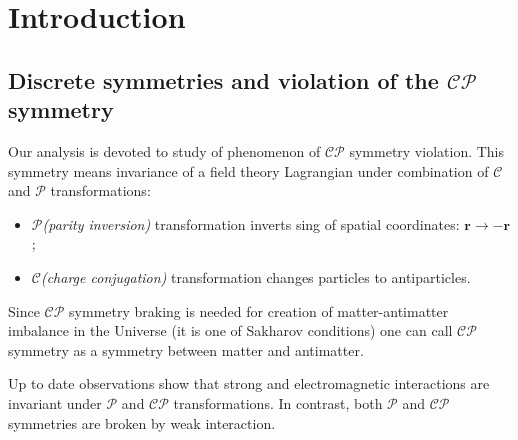 \documentclass[preprint,aps,showpacs]{revtex4}
\newcommand{\cpconj}{\ensuremath{\mathcal{CP}}\xspace}
\newcommand{\pconj}{\ensuremath{\mathcal{P}}\xspace}
\newcommand{\cconj}{\ensuremath{\mathcal{C}}\xspace}
\begin{document}

\maketitle

\tableofcontents

{\renewcommand{\thefootnote}{\fnsymbol{footnote}}}
\setcounter{footnote}{0}

\newpage
\section{Introduction}
\subsection{Discrete symmetries and violation of the \cpconj symmetry}
Our analysis is devoted to study of phenomenon of \cpconj symmetry violation. This symmetry means invariance of a field theory Lagrangian under combination of \cconj and \pconj transformations:
\begin{itemize}
 \item \pconj {\it (parity inversion)} transformation inverts sing of spatial coordinates: $\mathbf{r}\to -\mathbf{r}$;
 \item \cconj {\it (charge conjugation)} transformation changes particles to antiparticles.
\end{itemize}
Since \cpconj symmetry braking is needed for creation of matter-antimatter imbalance in the Universe (it is one of Sakharov conditions) one can call \cpconj symmetry as a symmetry between matter and antimatter.

Up to date observations show that strong and electromagnetic interactions are invariant under \pconj and \cpconj transformations. In contrast, both \pconj and \cpconj symmetries are broken by weak interaction. 
\end{document}
